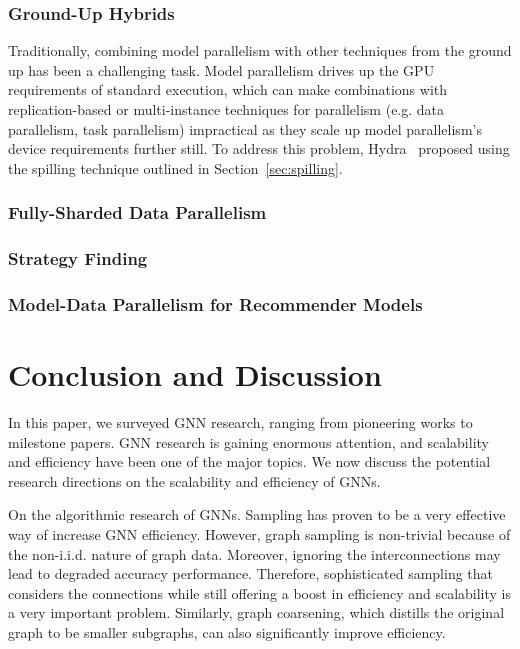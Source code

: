 \subsubsection{Ground-Up Hybrids}\label{sec:mt_parallel}
Traditionally, combining model parallelism with other techniques from the ground up has been a challenging task. Model parallelism drives up the GPU requirements of standard execution, which can make combinations with replication-based or multi-instance techniques for parallelism (e.g. data parallelism, task parallelism) impractical as they scale up model parallelism's device requirements further still. To address this problem, Hydra~\cite{hydra2021} proposed using the spilling technique outlined in Section~\ref{sec:spilling}.

\subsubsection{Fully-Sharded Data Parallelism}\label{sec:fsdp}

\subsubsection{Strategy Finding}

\subsubsection{Model-Data Parallelism for Recommender Models}

\section{Conclusion and Discussion}
\label{sec:conclusion}
In this paper, we surveyed GNN research, ranging from pioneering works to milestone papers. GNN research is gaining enormous attention, and scalability and efficiency have been one of the major topics.
We now discuss the potential research directions on the scalability and efficiency of GNNs.

On the algorithmic research of GNNs. Sampling has proven to be a very effective way of increase GNN efficiency. However, graph sampling is non-trivial because of the non-i.i.d. nature of graph data. Moreover, ignoring the interconnections may lead to degraded accuracy performance. Therefore, sophisticated sampling that considers the connections while still offering a boost in efficiency and scalability is a very important problem. Similarly, graph coarsening, which distills the original graph to be smaller subgraphs, can also significantly improve efficiency.

